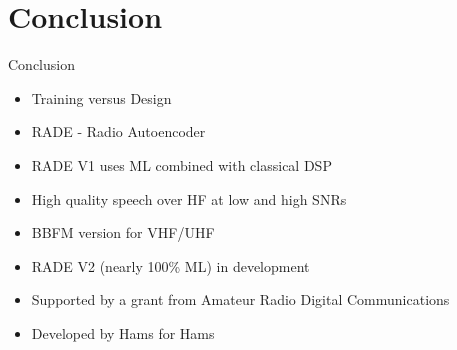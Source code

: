 \documentclass{beamer}
\begin{document}
\section{Conclusion}

\begin{frame}{Conclusion}
\begin{itemize}
	\item Training versus Design
	\item RADE - Radio Autoencoder
	\item RADE V1 uses ML combined with classical DSP
	\item High quality speech over HF at low and high SNRs
	\item BBFM version for VHF/UHF
	\item RADE V2 (nearly 100\% ML) in development
	\item Supported by a grant from Amateur Radio Digital Communications
	\item Developed by Hams for Hams
\end{itemize}

\end{frame}
\end{document}
